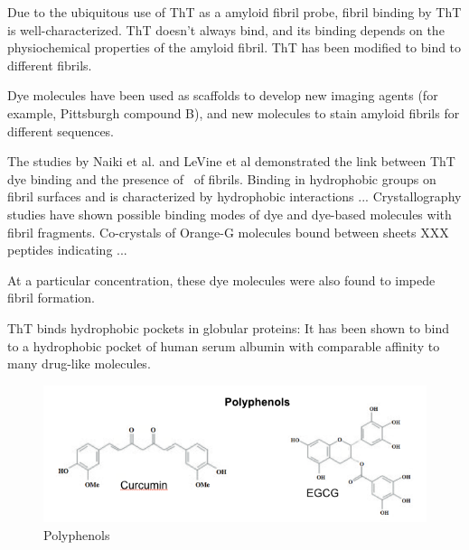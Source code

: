 Due to the ubiquitous use of ThT as a amyloid fibril probe, fibril binding by ThT is well-characterized.  ThT doesn't always bind, and its binding depends on the physiochemical properties of the amyloid fibril.  ThT has been modified to bind to different fibrils.\cite{XXX}

Dye molecules have been used as scaffolds to develop new imaging agents (for example, Pittsburgh compound B), and new molecules to stain amyloid fibrils for different sequences. 

The studies by Naiki et al. and LeVine et al demonstrated the link between ThT dye binding and the presence of \crossbs\ of fibrils. Binding in hydrophobic groups on fibril surfaces and is characterized by hydrophobic interactions ...
Crystallography studies have shown possible binding modes of dye and dye-based molecules with fibril fragments.\cite{XXX}
Co-crystals of Orange-G molecules bound between sheets XXX peptides indicating ...

At a particular concentration, these dye molecules were also found to impede fibril formation.\cite{XXX}

ThT binds hydrophobic pockets in globular proteins: It has been shown to bind to a hydrophobic pocket of human serum albumin with comparable affinity to many drug-like molecules.\cite{Groenning:2007p3436,Groenning:2007eo}




\begin{figure}
\centering
\includegraphics[width=6in]{figures/introduction/polyphenols.png}
\caption[Small molecule binders]{Polyphenols}
\label{fig:polyphenols}
\end{figure}

